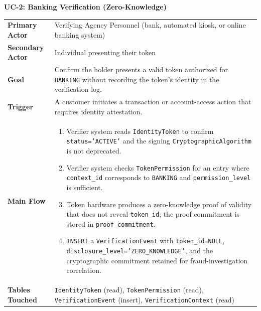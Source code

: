 \documentclass[11pt,letterpaper]{article}
\newcommand{\entity}[1]{\texttt{\color{navydark}#1}}
\newcommand{\usecase}[2]{%
  \needspace{3\baselineskip}%
  \vspace{6pt}%
  \noindent\colorbox{tabheader}{\parbox{\dimexpr\textwidth-2\fboxsep}{%
    \color{white}\small\bfseries\textsc{#1:} \mdseries #2}}%
  \nopagebreak[4]%
  \vspace{2pt}%
  \nopagebreak[4]%
}
\begin{document}
\usecase{UC-2}{Banking Verification (Zero-Knowledge)}
\noindent\begin{xltabular}{\textwidth}{>{\bfseries}p{1.4in} >{\RaggedRight\arraybackslash}X}
Primary Actor & Verifying Agency Personnel (bank, automated kiosk, or online banking system) \\
Secondary Actor & Individual presenting their token \\
Goal & Confirm the holder presents a valid token authorized for \texttt{BANKING} without recording the token's identity in the verification log. \\
Trigger & A customer initiates a transaction or account-access action that requires identity attestation. \\
Main Flow &
\begin{enumerate}
  \item Verifier system reads \entity{IdentityToken} to confirm \texttt{status='ACTIVE'} and the signing \entity{CryptographicAlgorithm} is not deprecated.
  \item Verifier system checks \entity{TokenPermission} for an entry where \texttt{context\_id} corresponds to \texttt{BANKING} and \texttt{permission\_level} is sufficient.
  \item Token hardware produces a zero-knowledge proof of validity that does not reveal \texttt{token\_id}; the proof commitment is stored in \texttt{proof\_commitment}.
  \item \texttt{INSERT} a \entity{VerificationEvent} with \texttt{token\_id=NULL}, \texttt{disclosure\_level='ZERO\_KNOWLEDGE'}, and the cryptographic commitment retained for fraud-investigation correlation.
\end{enumerate} \\
Tables Touched & \entity{IdentityToken} (read), \entity{TokenPermission} (read), \entity{VerificationEvent} (insert), \entity{VerificationContext} (read) \\
\end{xltabular}
\end{document}
